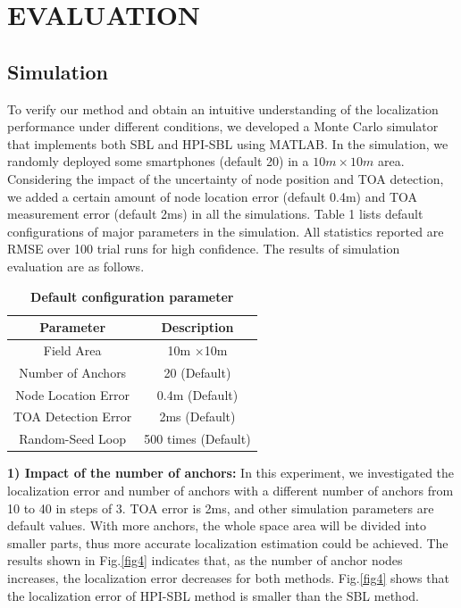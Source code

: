 \section{EVALUATION }
\label{section:results}

\subsection{Simulation}
To verify our method and obtain an intuitive understanding of the localization performance under different conditions,
we developed a Monte Carlo simulator that implements
both SBL and HPI-SBL using MATLAB. 
In the simulation, we randomly deployed some smartphones (default 20) in a $10m \times 10m$ area. 
Considering the impact of the uncertainty of node position and TOA detection, we added a certain amount of node location error (default 0.4m) and TOA measurement error (default 2ms) in all the simulations.
Table 1 lists default configurations of major parameters in the simulation.
All statistics reported are RMSE  over 100 trial runs for high confidence. The results of simulation evaluation are as follows.


\begin{table} \normalsize
\caption {\textbf{Default configuration parameter}} %
\centering %
    \begin{tabular}{|c|c|}
        \hline
\textbf{Parameter} & \textbf{Description} \\
 \hline
Field Area & 10m $\times$10m \\
\hline
Number of Anchors & 20 (Default) \\
 \hline
Node Location Error 	 & 0.4m (Default) \\
 \hline
TOA Detection Error 	 & 2ms (Default) \\
 \hline
Random-Seed Loop	 & 500 times (Default) \\
        \hline
    \end{tabular}
\end{table}


\textbf{1) Impact of the number of anchors:}
 In this experiment, we investigated the localization error and number of anchors with a different number of anchors from 10 to 40 in steps of 3. 
 TOA error is 2ms, and other simulation parameters are default values.
With more anchors, the whole space area will be divided into smaller parts, thus more accurate localization estimation could be achieved. 
The results shown in Fig.\ref{fig4} indicates that, as the number of anchor nodes increases, the localization error decreases for both methods.
Fig.\ref{fig4} shows that the localization error of HPI-SBL method is smaller than the SBL method.

